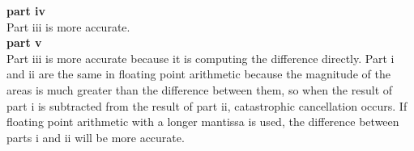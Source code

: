 \documentclass{article} %
\begin{document}
\textbf{part iv} \\
Part iii is more accurate. \\

\textbf{part v} \\ 
Part iii is more accurate because it is computing the difference directly.  Part i and ii are the same in floating point arithmetic because the magnitude of the areas is much greater than the difference between them, so when the result of part i is subtracted from the result of part ii, catastrophic cancellation occurs.  If floating point arithmetic with a longer mantissa is used, the difference between parts i and ii will be more accurate.
\end{document}
